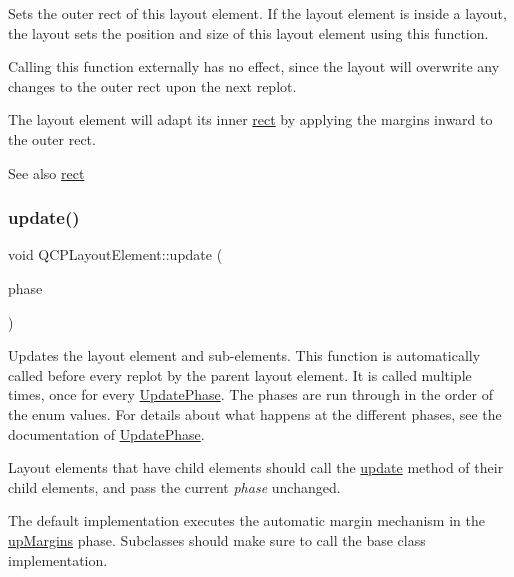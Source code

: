 Sets the outer rect of this layout element. If the layout element is inside a layout, the layout sets the position and size of this layout element using this function.

Calling this function externally has no effect, since the layout will overwrite any changes to the outer rect upon the next replot.

The layout element will adapt its inner \hyperlink{class_q_c_p_layout_element_a208effccfe2cca4a0eaf9393e60f2dd4}{rect} by applying the margins inward to the outer rect.

\begin{DoxySeeAlso}{See also}
\hyperlink{class_q_c_p_layout_element_a208effccfe2cca4a0eaf9393e60f2dd4}{rect} 
\end{DoxySeeAlso}
\mbox{\label{class_q_c_p_layout_element_a929c2ec62e0e0e1d8418eaa802e2af9b}} 
\subsubsection{\texorpdfstring{update()}{update()}}
{\footnotesize\ttfamily void Q\+C\+P\+Layout\+Element\+::update (\begin{DoxyParamCaption}\item[{\hyperlink{class_q_c_p_layout_element_a0d83360e05735735aaf6d7983c56374d}{Update\+Phase}}]{phase }\end{DoxyParamCaption})\hspace{0.3cm}{\ttfamily [virtual]}}

Updates the layout element and sub-\/elements. This function is automatically called before every replot by the parent layout element. It is called multiple times, once for every \hyperlink{class_q_c_p_layout_element_a0d83360e05735735aaf6d7983c56374d}{Update\+Phase}. The phases are run through in the order of the enum values. For details about what happens at the different phases, see the documentation of \hyperlink{class_q_c_p_layout_element_a0d83360e05735735aaf6d7983c56374d}{Update\+Phase}.

Layout elements that have child elements should call the \hyperlink{class_q_c_p_layout_element_a929c2ec62e0e0e1d8418eaa802e2af9b}{update} method of their child elements, and pass the current {\itshape phase} unchanged.

The default implementation executes the automatic margin mechanism in the \hyperlink{class_q_c_p_layout_element_a0d83360e05735735aaf6d7983c56374da288cb59a92280e47261a341f2813e676}{up\+Margins} phase. Subclasses should make sure to call the base class implementation. 

